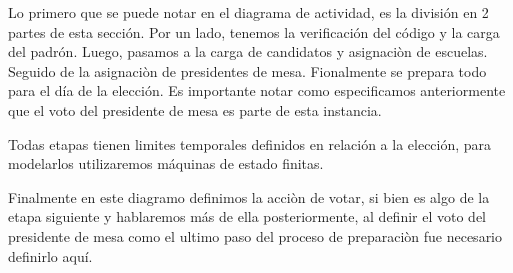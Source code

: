 Lo primero que se puede notar en el diagrama de actividad, es la división en 2 partes de esta sección. Por un lado, tenemos la verificación del código y la carga del padrón. Luego, pasamos a la carga de candidatos y asignaciòn de escuelas. Seguido de la asignaciòn de presidentes de mesa. Fionalmente se prepara todo para el día de la elección. Es importante notar como especificamos anteriormente que el voto del presidente de mesa es parte de esta instancia. 

Todas etapas tienen limites temporales definidos en relación a la elección, para modelarlos utilizaremos máquinas de estado finitas.

Finalmente en este diagramo definimos la acciòn de votar, si bien es algo de la etapa siguiente y hablaremos más de ella posteriormente, al definir el voto del presidente de mesa como el ultimo paso del proceso de preparaciòn fue necesario definirlo aquí.
